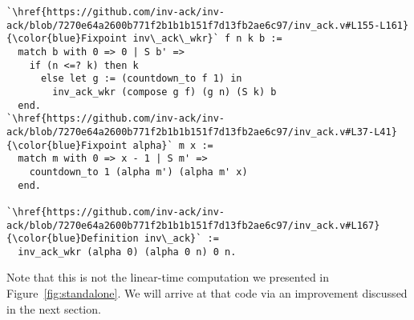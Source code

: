 %
%
\begin{lstlisting}
`\href{https://github.com/inv-ack/inv-ack/blob/7270e64a2600b771f2b1b1b151f7d13fb2ae6c97/inv_ack.v#L155-L161} {\color{blue}Fixpoint inv\_ack\_wkr}` f n k b :=
  match b with 0 => 0 | S b' =>
    if (n <=? k) then k
      else let g := (countdown_to f 1) in
        inv_ack_wkr (compose g f) (g n) (S k) b
  end.
`\href{https://github.com/inv-ack/inv-ack/blob/7270e64a2600b771f2b1b1b151f7d13fb2ae6c97/inv_ack.v#L37-L41}{\color{blue}Fixpoint alpha}` m x :=
  match m with 0 => x - 1 | S m' =>
    countdown_to 1 (alpha m') (alpha m' x)
  end.

`\href{https://github.com/inv-ack/inv-ack/blob/7270e64a2600b771f2b1b1b151f7d13fb2ae6c97/inv_ack.v#L167}{\color{blue}Definition inv\_ack}` :=
  inv_ack_wkr (alpha 0) (alpha 0 n) 0 n.
\end{lstlisting}

\noindent Note that this is not the linear-time computation we presented in
Figure~\ref{fig:standalone}. We will arrive at that code via an improvement discussed in the next section.

